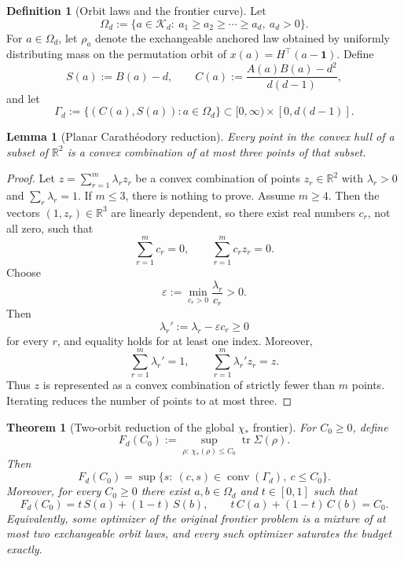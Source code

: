 \documentclass[11pt]{amsart}
\newtheorem{theorem}{Theorem}[section]
\newtheorem{lemma}[lemma]{Lemma}
\theoremstyle{definition}
\newtheorem{definition}[definition]{Definition}
\DeclareMathOperator{\tr}{tr}
\DeclareMathOperator{\conv}{conv}
\newcommand{\one}{\mathbf 1}
\newcommand{\R}{\mathbb R}
\newcommand{\cK}{\mathcal K}
\begin{document}
\begin{definition}[Orbit laws and the frontier curve]\label{def:orbit-frontier}
Let
\[
\Omega_d:=\{a\in\cK_d:\ a_1\ge a_2\ge \cdots \ge a_d,\ a_d>0\}.
\]
For $a\in\Omega_d$, let $\rho_a$ denote the exchangeable anchored law obtained by uniformly distributing mass on the permutation orbit of $x(a)=H^\top(a-\one)$. Define
\[
S(a):=B(a)-d,
\qquad
C(a):=\frac{A(a)B(a)-d^2}{d(d-1)},
\]
and let
\[
\Gamma_d:=\{(C(a),S(a)): a\in\Omega_d\}\subset [0,\infty)\times [0,d(d-1)].
\]
\end{definition}

\begin{lemma}[Planar Carath\'eodory reduction]\label{lem:planar-car}
Every point in the convex hull of a subset of $\R^2$ is a convex combination of at most three points of that subset.
\end{lemma}

\begin{proof}
Let $z=\sum_{r=1}^m \lambda_r z_r$ be a convex combination of points $z_r\in\R^2$ with $\lambda_r>0$ and $\sum_r\lambda_r=1$. If $m\le 3$, there is nothing to prove. Assume $m\ge 4$. Then the vectors $(1,z_r)\in\R^3$ are linearly dependent, so there exist real numbers $c_r$, not all zero, such that
\[
\sum_{r=1}^m c_r=0,
\qquad
\sum_{r=1}^m c_r z_r=0.
\]
Choose
\[
\varepsilon:=\min_{c_r>0}\frac{\lambda_r}{c_r}>0.
\]
Then
\[
\lambda_r':=\lambda_r-\varepsilon c_r\ge 0
\]
for every $r$, and equality holds for at least one index. Moreover,
\[
\sum_{r=1}^m \lambda_r'=1,
\qquad
\sum_{r=1}^m \lambda_r' z_r=z.
\]
Thus $z$ is represented as a convex combination of strictly fewer than $m$ points. Iterating reduces the number of points to at most three.
\end{proof}

\begin{theorem}[Two-orbit reduction of the global $\chi_*$ frontier]\label{thm:two-orbit}
For $C_0\ge 0$, define
\[
F_d(C_0):=\sup_{\rho:\,\chi_*(\rho)\le C_0}\tr\Sigma(\rho).
\]
Then
\[
F_d(C_0)=\sup\{s:\ (c,s)\in \conv(\Gamma_d),\ c\le C_0\}.
\]
Moreover, for every $C_0\ge 0$ there exist $a,b\in\Omega_d$ and $t\in[0,1]$ such that
\[
F_d(C_0)=t\,S(a)+(1-t)\,S(b),
\qquad
t\,C(a)+(1-t)\,C(b)= C_0.
\]
Equivalently, some optimizer of the original frontier problem is a mixture of at most two exchangeable orbit laws, and every such optimizer saturates the budget exactly.
\end{theorem}
\end{document}

